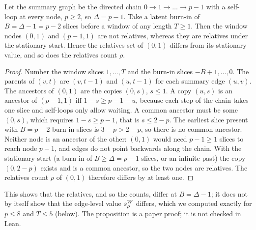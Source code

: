 \begin{proposition}\label{prop:chainsharp}
Let the summary graph be the directed chain $0\to1\to\dots\to p-1$ with a
self-loop at every node, $p\ge2$, so $\Delta=p-1$. Take a latent burn-in of
$B=\Delta-1=p-2$ slices before a window of any length $T\ge1$. Then the window
nodes $(0,1)$ and $(p-1,1)$ are not relatives, whereas they are relatives under
the stationary start. Hence the relatives set of $(0,1)$ differs from its
stationary value, and so does the relatives count $\rho$.
\end{proposition}
\begin{proof}
Number the window slices $1,\dots,T$ and the burn-in slices $-B+1,\dots,0$. The
parents of $(v,t)$ are $(v,t-1)$ and $(u,t-1)$ for each summary edge $(u,v)$.
The ancestors of $(0,1)$ are the copies $(0,s)$, $s\le1$. A copy $(u,s)$ is an
ancestor of $(p-1,1)$ iff $1-s\ge p-1-u$, because each step of the chain takes
one slice and self-loops only allow waiting. A common ancestor must be some
$(0,s)$, which requires $1-s\ge p-1$, that is $s\le2-p$. The earliest slice
present with $B=p-2$ burn-in slices is $3-p>2-p$, so there is no common
ancestor. Neither node is an ancestor of the other: $(0,1)$ would need $p-1\ge1$
slices to reach node $p-1$, and edges do not point backwards along the chain.
With the stationary start (a burn-in of $B\ge\Delta=p-1$ slices, or an infinite
past) the copy $(0,2-p)$ exists and is a common ancestor, so the two nodes are
relatives. The relatives count $\rho$ of $(0,1)$ therefore differs by at least
one. \end{proof}
This shows that the relatives, and so the counts, differ at $B=\Delta-1$; it does
not by itself show that the edge-level value $s_\rho^W$ differs, which we computed
exactly for $p\le8$ and $T\le5$ (below). The proposition is a paper proof; it is
not checked in Lean.

